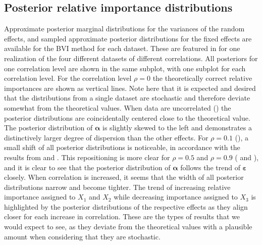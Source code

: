 \subsection{Posterior relative importance distributions}
\label{sec:posterior_distributions}
Approximate posterior marginal distributions for the variances of the random effects, and sampled approximate posterior distributions for the fixed effects are available for the BVI method for each dataset.
These are featured in  for one realization of the four different datasets of different correlations.
All posteriors for one correlation level are shown in the same subplot, with one subplot for each correlation level. 
For the correlation level $\rho=0$ the theoretically correct relative importances are shown as vertical lines.
Note here that it is expected and desired that the distributions from a single dataset are stochastic and therefore deviate somewhat from the theoretical values.
When data are uncorrelated () the posterior distributions are coincidentally centered close to the theoretical value.
The posterior distribution of $\boldsymbol{\alpha}$ is slightly skewed to the left and demonstrates a distinctively larger degree of dispersion than the other effects.
For $\rho=0.1$ (), a small shift of all posterior distributions is noticeable, in accordance with the results from  and . 
This repositioning is more clear for $\rho=0.5$ and $\rho=0.9$ ( and ), and it is clear to see that the posterior distribution of $\boldsymbol{\alpha}$ follows the trend of $\boldsymbol{\varepsilon}$ closely.
When correlation is increased, it seems that the width of all posterior distributions narrow and become tighter.
The trend of increasing relative importance assigned to $X_1$ and $X_2$ while decreasing importance assigned to $X_3$ is highlighted by the posterior distributions of the respective effects as they align closer for each increase in correlation.
These are the types of results that we would expect to see, as they deviate from the theoretical values with a plausible amount when considering that they are stochastic.
